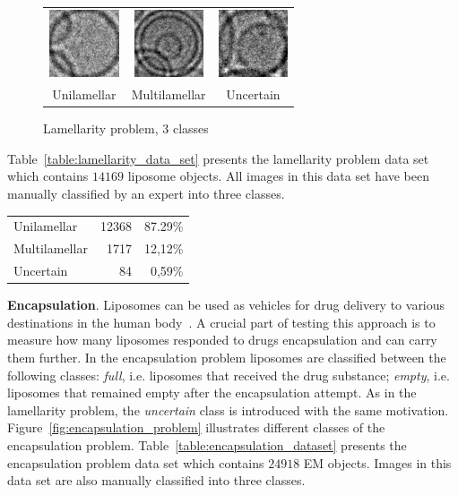 \documentclass[a4paper, 11pt, table]{article}
\begin{document}
\begin{figure}[H]
\centering
\begin{tabular}{ccc}
	\includegraphics[height=2cm, keepaspectratio]{problem_description/lamellarity/uni} & \includegraphics[height=2cm, keepaspectratio]{problem_description/lamellarity/multi} & \includegraphics[height=2cm, keepaspectratio]{problem_description/lamellarity/uncertain} \\
	Unilamellar & Multilamellar & Uncertain \\[6pt]
\end{tabular}
\caption{Lamellarity problem, 3 classes}
\label{fig:lamellarity_problem}
\end{figure}

Table~\ref{table:lamellarity_data_set} presents the lamellarity problem data set which contains $\num{14169}$ liposome objects. All images in this data set have been manually classified by an expert into three classes.

\begin{center}
\label{table:lamellarity_data_set}
\begin{tabular}{lrr}
\toprule
Unilamellar & \num{12368} & 87.29\% \\ 
Multilamellar & \num{1717} & 12,12\% \\ 
Uncertain & \num{84} & 0,59\% \\ 
\end{tabular} 
\end{center}


\textbf{Encapsulation}. Liposomes can be used as vehicles for drug delivery to various destinations in the human body~\cite{betageri1993liposome}. A crucial part of testing this approach is to measure how many liposomes responded to drugs encapsulation and can carry them further. In the encapsulation problem liposomes are classified between the following classes: \textit{full}, i.e. liposomes that received the drug substance; \textit{empty}, i.e. liposomes that remained empty after the encapsulation attempt. As in the lamellarity problem, the \textit{uncertain} class is introduced with the same motivation. Figure~\ref{fig:encapsulation_problem} illustrates different classes of the encapsulation problem. Table~\ref{table:encapsulation_dataset} presents the encapsulation problem data set which contains $\num{24918}$ EM objects. Images in this data set are also manually classified into three classes.
\end{document}
